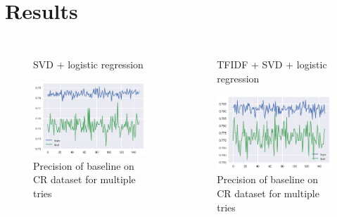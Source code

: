 \documentclass[xcolor={table}]{beamer}
\begin{document}
\section{Results}
\begin{frame}{}
    \begin{columns}
                   \begin{figure}[H]
                    \centering
                    \caption*{SVD + logistic regression}
                    \includegraphics[height=0.4\textheight]{images/CRDataset.png}
                    \caption{Precision of baseline on CR dataset for multiple tries}
                \end{figure}

                \begin{figure}[H]
                    \centering
                    \caption*{TFIDF + SVD + logistic regression}
                    \includegraphics[height=0.4\textheight]{images/CRDataset_tfidf.png}
                    \caption{Precision of baseline on CR dataset for multiple tries}
                \end{figure}
    \end{columns}
                
\end{frame} 
\end{document}
